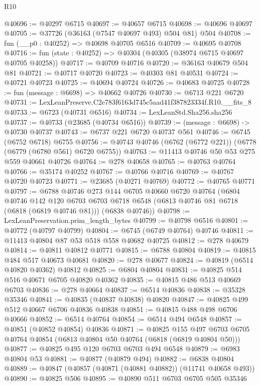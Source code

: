 \begin{lexlean}{R10}
\begin{coremodule}
@40696 := @40297 @6715
@40697 := @40657 @6715
@40698 := @40696 @40697
@40705 := @37726 (@36163 (@7547 @40697 @493) @504 @81) @504
@40708 := fun (__p0 : @40252) => @40698 @40705 @6516
@40709 := @40695 @40708
@40716 := fun (state : @40252) => @40304 (@40305 (@38974 @6715 @40697 @40705 @40258))
@40717 := @40709 @40716
@40720 := @36163 @40679 @504 @81
@40721 := @40717 @40720
@40723 := @40303 @81 @40531
@40724 := @40721 @40723
@40725 := @40694 @40724
@40726 := @40683 @40725
@40728 := fun (message : @6698) => @40662 @40726
@40730 := @6713 @221 @6720
@40731 := LexLeanPreserve.C2e783f6163d745c5aad41f387823334f.R10.__fits_8
@40733 := @6723 (@40731 @6516)
@40734 := LexLeanStd.Sha256.sha256
@40737 := @40733 (@23685 (@40734 @6516))
@40739 := (message : @6698) -> @40730 @40737
@40743 := @6737 @221 @6720 @40737 @561
@40746 := @6745 (@6752 @6718) @6755
@40756 := @40743 @40746 (@6762 (@6772 @221)) (@6778 (@6779 (@6780 @561) @6720 @6755))
@40763 := @11413 @40746 @50 @53 @275 @559 @40661 @40726
@40764 := @278 @40658
@40765 := @40763 @40764
@40766 := @35174 @40252
@40767 := @40766 @40716
@40769 := @40767 @40720 @40723
@40771 := @23685 (@40271 @40769)
@40772 := @40765 @40771
@40797 := @6788
    @40746
    @273
    @144
    @6705
    @40660
    @6720
    @40764
    (@6804
      @40746
      @142
      @120
      @6703
      @6703
      @6718
      @6548
      (@6813 @40746 @81 @6718 (@6818 (@6819 @40746 @81)))
      (@6838 @40746))
@40798 := LexLeanPreservation.prim_length_bytes
@40799 := @40798 @6516
@40801 := @40772 (@40797 @40799)
@40804 := @6745 (@6749 @40764) @40746
@40811 := @11413 @40804 @87 @53 @518 @558 @40682 @40725
@40812 := @278 @40679
@40814 := @40811 @40812 @40771
@40815 := @6788 @40804
@40819 := @40815 @484 @517 @40673 @40681
@40820 := @278 @40677
@40824 := @40819 (@6514 @40820 @40362) @40812
@40825 := @6804 @40804
@40831 := @40825 @514 @516 @40671 @6705 @40820 @40362
@40835 := @40815 @486 @513 @40669 @6703
@40836 := @278 @40664
@40837 := @6514 @40836
@40838 := @35328 @35346
@40841 := @40835 (@40837 @40838) @40820
@40847 := @40825 @499 @512 @40667 @6706 @40836 @40838
@40851 := @40815 @488 @498 @6706 @40666
@40852 := @6514 @40764
@40854 := @6514 @494 @6548
@40857 := @40851 (@40852 @40854) @40836
@40871 := @40825
    @155
    @497
    @6703
    @6705
    @40764
    @40854
    (@6813 @40804 @50 @40764 (@6818 (@6819 @40804 @50)))
@40877 := @40825 @495 @120 @6703 @6703 @494 @6548
@40879 := @6983 @40804 @53
@40881 := @40877 (@40879 @494)
@40882 := @6838 @40804
@40889 := @40847 (@40857 (@40871 (@40881 @40882)) (@11741 @40658 @493))
@40890 := @40825 @506
@40895 := @40890 @511 @6703 @6705 @505 @35346

\end{coremodule}
\end{lexlean}
